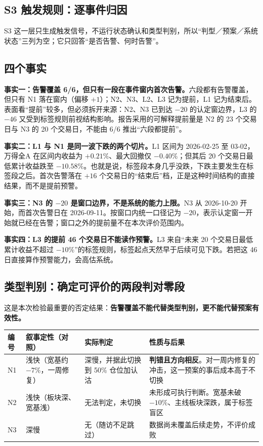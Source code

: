 \documentclass[12pt,a4paper]{ctexart}
\begin{document}
\subsection{S3 触发规则：逐事件归因}



S3 这一层只生成触发信号，不运行状态确认和类型判别，所以“判型／预案／系统状态”三列为空；它只回答“是否告警、何时告警”。

\subsection{四个事实}

\textbf{事实一：告警覆盖 6/6，但只有一段在事件窗内首次告警。}六段都有告警覆盖，但只有 N1 落在窗内（偏移 $+1$）；N2、N3、L2、L3 记为提前，L1 记为结束后。表面看“提前”较多，但必须拆开来源：N2、N3 已到达 $-20$ 的认定窗边界，L3 的 $-46$ 又受到标签规则前视结构影响。报告采用的可解释提前量是 N2 的 23 个交易日与 N3 的 20 个交易日，不能由 6/6 推出“六段都提前”。

\textbf{事实二：L1 与 N1 是同一波下跌的两个切片。}L1 区间为 2026-02-25 至 03-02，万得全A 在区间内收益为 $+0.21\%$、最大回撤仅 $-0.40\%$；但其后 20 个交易日最低累计收益跌至 $-10.58\%$。也就是说，标签段本身几乎没跌，下跌主要发生在标签段之后。首次告警落在 $+16$ 个交易日的“结束后”档，正是这种时间结构的直接结果，而不是提前预警。

\textbf{事实三：N3 的 $-20$ 是窗口边界，不是系统的能力上限。}N3 从 2026-10-20 开始，而首次告警日在 2026-09-11。按窗口内统一口径记为 $-20$，表示认定窗一开始就已经在告警；窗口之外的提前量不在本次评价范围内。

\textbf{事实四：L3 的提前 46 个交易日不能读作预警。}L3 来自“未来 20 个交易日最低累计收益不超过 $-10\%$”的标签规则，标签起点天然早于后续可见下跌。若把这 46 日直接算作预警能力，会高估系统。

\subsection{类型判别：确定可评价的两段判对零段}

这是本次检验最重要的否定结果：\textbf{告警覆盖不能代替类型判别，更不能代替预案有效性。}

\begin{center}\small
\begin{tabularx}{\textwidth}{@{}>{\raggedright\arraybackslash}p{1.0cm}>{\raggedright\arraybackslash}p{3.6cm}>{\raggedright\arraybackslash}p{3.0cm}Y@{}}
\toprule
\textbf{编号} & \textbf{叙事定性（对照）} & \textbf{实际判定} & \textbf{性质与后果} \\
\midrule
N1 & 浅快（宽基约 $-7\%$，一周修复） & 深慢，并据此切换到 50\% 仓位加认沽 & \textbf{判错且方向相反}。对一周内修复的冲击，这一预案的事后成本高于不切换 \\
N2 & 浅快（板块深、宽基浅） & 无法判定，未切换 & 未形成可执行判断。宽基未破 $-10\%$、主线板块深跌，属于标签盲区 \\
N3 & 深慢 & 无（随访不足跳过） & 数据尚未覆盖后续走势，不评价成败 \\
\bottomrule
\end{tabularx}
\end{center}
\end{document}
